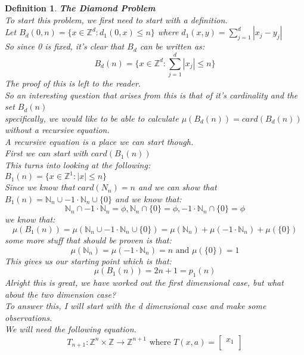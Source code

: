 \documentclass[12pt]{extarticle}
\theoremstyle{plain}
\theoremstyle{plain}
\theoremstyle{plain}
\theoremstyle{Definition}
\newtheorem{def.}{Definition}[section]
\theoremstyle{Definition}
\theoremstyle{plain}
\theoremstyle{plain}
\begin{document}
\begin{def.} \textbf{The Diamond Problem} \\ 
	To start this problem, we first need to start with a definition. \\ 
	Let $B_d(0,n) = \{x \in \mathbb{Z}^d : d_1(0,x) \leq n\}$ 
	where $d_1(x,y) = \sum_{j=1}^{d} |x_j-y_j|$ \\
	So since 0 is fixed, it's clear that $B_d$ can be written as: \\ 
	$$B_d(n) = \{x \in \mathbb{Z}^d : \sum_{j=1}^{d} |x_j| \leq n\}$$
	The proof of this is left to the reader. \\ 
	So an interesting question that arises from this is that of it's cardinality and the set $B_d(n)$ \\ 
	specifically, we would like to be able to calculate $\mu(B_d(n)) = card(B_d(n))$ without a recursive equation. \\ 
	A recursive equation is a place we can start though. \\ 
	First we can start with $card(B_1(n))$ \\ 
	This turns into looking at the following: \\ 
	$B_1(n) = \{x \in \mathbb{Z}^1 : |x| \leq n\}$ \\ 
	Since we know that $card(N_n) = n$ and we can show that $B_1(n) = \mathbb{N}_n \cup -1\cdot\mathbb{N}_n  \cup \{0\}$ and we know that: 
	$$\mathbb{N}_n \cap -1\cdot\mathbb{N}_n = \phi, \mathbb{N}_n \cap \{0\} = \phi, -1\cdot\mathbb{N}_n \cap \{0\} = \phi$$
	we know that: \\
	$$\mu(B_1(n)) = \mu(\mathbb{N}_n \cup -1\cdot\mathbb{N}_n  \cup \{0\}) = \mu(\mathbb{N}_n) + \mu(-1\cdot\mathbb{N}_n) + \mu(\{0\})$$
	some more stuff that should be proven is that: \\ 
	$$\mu(\mathbb{N}_n) = \mu(-1\cdot\mathbb{N}_n) = n \text{ and } \mu(\{0\}) = 1$$
	This gives us our starting point which is that: \\ 
	$$\mu(B_1(n)) = 2n + 1 = p_1(n)$$
	Alright this is great, we have worked  out the first dimensional case, but what about the two dimension case? \\ 
	To answer this, I will start with the d dimensional case and make some observations. \\ 
	We will need the following equation. \\
	$$T_{n+1} : \mathbb{Z}^n \times \mathbb{Z} \to \mathbb{Z}^{n+1} \text{ where } T(x,a) = \begin{bmatrix}
	x_1 \\ 

\end{bmatrix}$$
\end{def.}
\end{document}
